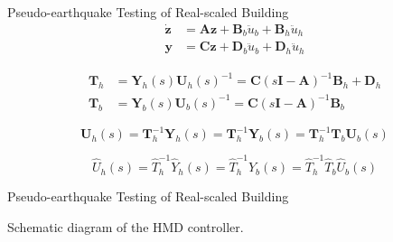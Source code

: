 \documentclass[usepdftitle=false]{beamer}
\newcommand{\matr}[1]{\mathbf{#1}}
\begin{document}
\begin{frame}{Pseudo-earthquake Testing of Real-scaled Building}
\begin{equation}\label{eq:7-11}
\begin{aligned}
\matr{\dot{z}}&= \matr{A}\matr{z} + \matr{B}_{b}\ddot{u}_{b}+\matr{B}_{h}\ddot{u}_{h}\\
\matr{y}&=\matr{C}\matr{z}+\matr{D}_{b}\ddot{u}_{b}+\matr{D}_{h}\ddot{u}_{h}
\end{aligned}
\end{equation}

\begin{equation}\label{eq:7-12}
\begin{aligned}
\matr{T}_{h}&=\matr{Y}_{h}(s)\matr{U}_{h}(s)^{-1} = \matr{C}\left(s\matr{I}-\matr{A}\right)^{-1}\matr{B}_{h} + \matr{D}_{h}\\
\matr{T}_{b}&=\matr{Y}_{b}(s)\matr{U}_{b}(s)^{-1} = \matr{C}\left(s\matr{I}-\matr{A}\right)^{-1}\matr{B}_{b}
\end{aligned}
\end{equation}

\begin{equation}\label{eq:7-13}
\matr{U}_{h}(s) = \matr{T}_{h}^{-1}\matr{Y}_{h}(s) = \matr{T}_{h}^{-1}\matr{Y}_{b}(s) = \matr{T}_{h}^{-1}\matr{T}_{b}\matr{U}_{b}(s)
\end{equation}

\begin{equation}\label{eq:7-14}
\hat{U}_{h}(s) = \hat{T}_{h}^{-1}\hat{Y}_{h}(s) = \hat{T}_{h}^{-1}\hat{Y}_{b}(s) = \hat{T}_{h}^{-1}\hat{T}_{b}\hat{U}_{b}(s)
\end{equation}

\end{frame}

\begin{frame}{Pseudo-earthquake Testing of Real-scaled Building}
\begin{figure}[!ht]
\centering
\setcounter{subfigure}{0}
\label{fig:7-9}
\end{figure}
Schematic diagram of the HMD controller.
\end{frame}
\end{document}
